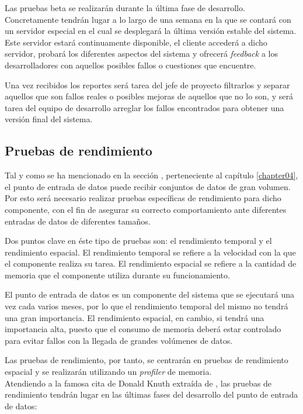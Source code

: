 Las pruebas beta se realizarán durante la última fase de desarrollo.  Concretamente tendrán lugar a lo largo de una semana en la que se contará con un servidor especial en el cual se desplegará la última versión estable del sistema.  Este servidor estará continuamente disponible, el cliente accederá a dicho servidor, probará los diferentes aspectos del sistema y ofrecerá \textit{feedback} a los desarrolladores con aquellos posibles fallos o cuestiones que encuentre.

Una vez recibidos los reportes será tarea del jefe de proyecto filtrarlos y separar aquellos que son fallos reales o posibles mejoras de aquellos que no lo son, y será tarea del equipo de desarrollo arreglar los fallos encontrados para obtener una versión final del sistema.


\subsection{Pruebas de rendimiento}
Tal y como se ha mencionado en la sección , perteneciente al capítulo \ref{chapter04}, el punto de entrada de datos puede recibir conjuntos de datos de gran volumen.  Por esto será necesario realizar pruebas específicas de rendimiento para dicho componente, con el fin de asegurar su correcto comportamiento ante diferentes entradas de datos de diferentes tamaños.

Dos puntos clave en éste tipo de pruebas son: el rendimiento temporal y el rendimiento espacial.  El rendimiento temporal se refiere a la velocidad con la que el componente realiza su tarea.  El rendimiento espacial se refiere a la cantidad de memoria que el componente utiliza durante su funcionamiento.

El punto de entrada de datos es un componente del sistema que se ejecutará una vez cada varios meses, por lo que el rendimiento temporal del mismo no tendrá una gran importancia.  El rendimiento espacial, en cambio, si tendrá una importancia alta, puesto que el consumo de memoria deberá estar controlado para evitar fallos con la llegada de grandes volúmenes de datos.

Las pruebas de rendimiento, por tanto, se centrarán en pruebas de rendimiento espacial y se realizarán utilizando un \textit{profiler} de memoria.\\
Atendiendo a la famosa cita de Donald Knuth extraída de \cite{knuth:structuredprogramming}, las pruebas de rendimiento tendrán lugar en las últimas fases del desarrollo del punto de entrada de datos:  


